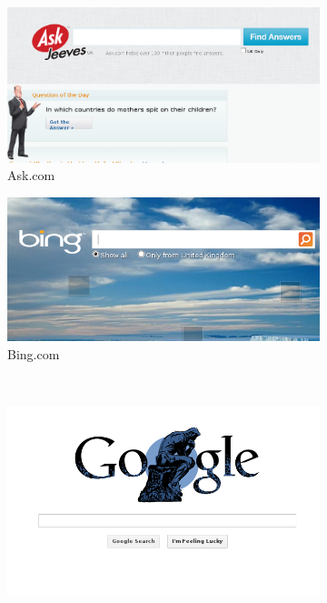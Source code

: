 \documentclass[12pt,a4paper]{article}
\begin{document}
\begin{figure}[!ht]
        \centering
        \begin{subfigure}[b]{0.50\textwidth}
                \centering
                \includegraphics[width=\textwidth]{images/ask_front.png}
                \caption{Ask.com}
                \label{fig:ask_interface}
        \end{subfigure}%
        \begin{subfigure}[b]{0.50\textwidth}
                \centering
                \includegraphics[width=\textwidth]{images/bing_front.png}
                \caption{Bing.com}
                \label{fig:bing_interface}
        \end{subfigure}\\
        \begin{subfigure}[b]{0.50\textwidth}
                \centering
                \includegraphics[width=\textwidth]{images/google_front.png}

\end{subfigure}
\end{figure}
\end{document}
